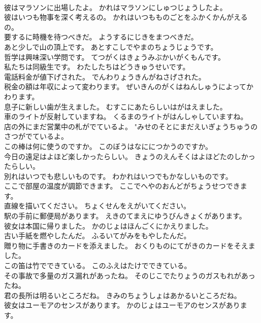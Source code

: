 \documentclass[8pt]{extreport}
\begin{document}
\begin{CJK}{UTF8}{min}
\\	彼はマラソンに出場したよ。	かれはマラソンにしゅつじょうしたよ。 
\\	彼はいつも物事を深く考えるの。	かれはいつもものごとをふかくかんがえるの。 
\\	要するに時機を待つべきだ。	ようするにじきをまつべきだ。 
\\	あと少しで山の頂上です。	あとすこしでやまのちょうじょうです。 
\\	哲学は興味深い学問です。	てつがくはきょうみぶかいがくもんです。 
\\	私たちは同級生です。	わたしたちはどうきゅうせいです。 
\\	電話料金が値下げされた。	でんわりょうきんがねさげされた。 
\\	税金の額は年収によって変わります。	ぜいきんのがくはねんしゅうによってかわります。 
\\	息子に新しい歯が生えました。	むすこにあたらしいはがはえました。 
\\	車のライトが反射していますね。	くるまのライトがはんしゃしていますね。 
\\	店の外にまだ営業中の札がでているよ。	"みせのそとにまだえいぎょうちゅうのさつがでているよ。 
\\	この棒は何に使うのですか。	このぼうはなににつかうのですか。 
\\	今日の遠足はよほど楽しかったらしい。	きょうのえんそくはよほどたのしかったらしい。 
\\	別れはいつでも悲しいものです。	わかれはいつでもかなしいものです。 
\\	ここで部屋の温度が調節できます。	ここでへやのおんどがちょうせつできます。 
\\	直線を描いてください。	ちょくせんをえがいてください。 
\\	駅の手前に郵便局があります。	えきのてまえにゆうびんきょくがあります。 
\\	彼女は本国に帰りました。	かのじょはほんごくにかえりました。 
\\	古い手紙を燃やしたんだ。	ふるいてがみをもやしたんだ。 
\\	贈り物に手書きのカードを添えました。	おくりものにてがきのカードをそえました。 
\\	この笛は竹でできている。	このふえはたけでできている。 
\\	その事故で多量のガス漏れがあったね。	そのじこでたりょうのガスもれがあったね。 
\\	君の長所は明るいところだね。	きみのちょうしょはあかるいところだね。 
\\	彼女はユーモアのセンスがあります。	かのじょはユーモアのセンスがあります。 

\end{CJK}
\end{document}
